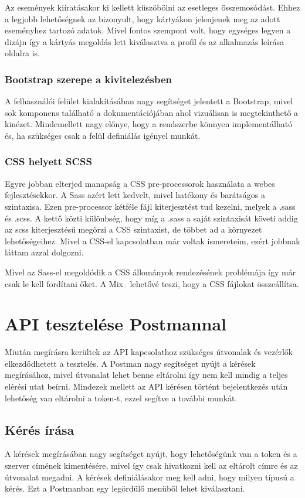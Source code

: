 \documentclass[
]{thesis-ekf}
\theoremstyle{definition}
\theoremstyle{remark}
\begin{document}
	Az események kiíratásakor ki kellett küszöbölni az esetleges összemosódást. Ehhez a legjobb lehetőségnek az bizonyult, hogy kártyákon jelenjenek meg az adott eseményhez tartozó adatok. Mivel fontos szempont volt, hogy egységes legyen a dizájn így a kártyás megoldás lett kiválasztva a profil és az alkalmazás leírása oldalra is. 
	
	\subsection{Bootstrap szerepe a kivitelezésben}
	
	A felhasználói felület kialakításában nagy segítséget jelentett a Bootstrap, mivel sok komponens található a dokumentációjában ahol vizuálisan is megtekinthető a kinézet. Mindemellett nagy előnye, hogy a rendszerbe könnyen implementálható és, ha szükséges csak a felül definiálás igényel munkát.
	
	\subsection{CSS helyett SCSS}
	
	Egyre jobban elterjed manapság a CSS pre-processorok használata a webes fejlesztésekkor. A Sass azért lett kedvelt, mivel hatékony és barátságos a szintaxisa. Ezen pre-processor kétféle fájl kiterjesztést tud kezelni, melyek a .sass és .scss. A kettő közti különbség, hogy míg a .sass a saját szintaxisát követi addig az scss kiterjesztésű megőrzi a CSS szintaxist, de többet ad a környezet lehetőségeihez. Mivel a CSS-el kapcsolatban már voltak ismereteim, ezért jobbnak láttam azzal dolgozni. 
	
	Mivel az Sass-el megoldódik a CSS állományok rendezésének problémája így már csak le kell fordítani őket. A Mix~\cite{laravel_mix} lehetővé teszi, hogy a CSS fájlokat összeállítsa.  
	
	\chapter{API tesztelése Postmannal}
	Miután megírásra kerültek az API kapcsolathoz szükséges útvonalak és vezérlők elkezdődhetett a tesztelés. A Postman nagy segítséget nyújt a kérések megírásához, mivel útvonalat lehet benne eltárolni így nem kell mindig a teljes elérési utat beírni. Mindezek mellett az API kérésen történt bejelentkezés után lehetőség van eltárolni a token-t, ezzel segítve a további munkát. 
	
	\section{Kérés írása}
	A kérések megírásában nagy segítséget nyújt, hogy lehetőségünk van a token és a szerver címének kimentésére, mivel így csak hivatkozni kell az eltárolt címre és az útvonalat megadni. A kérések definiálásakor meg kell adni, hogy milyen típusú a kérés. Ezt a Postmanban egy legördülő menüből lehet kiválasztani. 
	
\end{document}
